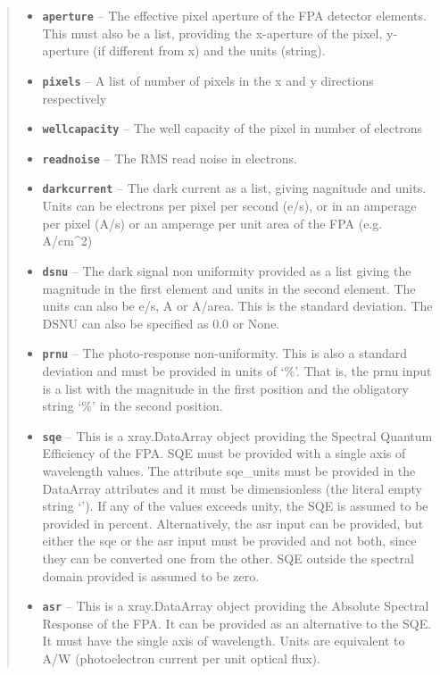 \documentclass[a4paper,10pt,english]{sphinxmanual}
\begin{document}
\begin{fulllineitems}
\begin{fulllineitems}
\begin{quote}
\begin{description}
\begin{itemize}
\item {} 
\textbf{\texttt{aperture}} -- The effective pixel aperture of the FPA detector elements. This must also be a list, providing
the x-aperture of the pixel, y-aperture (if different from x) and the units (string).

\item {} 
\textbf{\texttt{pixels}} -- A list of number of pixels in the x and y directions respectively

\item {} 
\textbf{\texttt{wellcapacity}} -- The well capacity of the pixel in number of electrons

\item {} 
\textbf{\texttt{readnoise}} -- The RMS read noise in electrons.

\item {} 
\textbf{\texttt{darkcurrent}} -- The dark current as a list, giving nagnitude and units. Units can be electrons per pixel
per second (e/s), or in an amperage per pixel (A/s) or an amperage per unit area of the FPA (e.g. A/cm\textasciicircum{}2)

\item {} 
\textbf{\texttt{dsnu}} -- The dark signal non uniformity provided as a list giving the magnitude in the first element
and units in the second element. The units can also be e/s, A or A/area. This is the standard deviation.
The DSNU can also be specified as 0.0 or None.

\item {} 
\textbf{\texttt{prnu}} -- The photo-response non-uniformity. This is also a standard deviation and must be provided in units
of `\%'. That is, the prnu input is a list with the magnitude in the first position and the obligatory
string `\%' in the second position.

\item {} 
\textbf{\texttt{sqe}} -- This is a xray.DataArray object providing the Spectral Quantum Efficiency of the FPA. SQE must be
provided with a single axis of wavelength values. The attribute sqe\_units must be provided in the
DataArray attributes and it must be dimensionless (the literal empty string `'). If any of the values
exceeds unity, the SQE is assumed to be provided in percent. Alternatively, the asr input can be provided,
but either the sqe or the asr input must be provided and not both, since they can be converted one from
the other. SQE outside the spectral domain provided is assumed to be zero.

\item {} 
\textbf{\texttt{asr}} -- This is a xray.DataArray object providing the Absolute Spectral Response of the FPA. It can be
provided as an alternative to the SQE. It must have the single axis of wavelength. Units are equivalent
to A/W (photoelectron current per unit optical flux).


\end{itemize}
\end{description}
\end{quote}
\end{fulllineitems}
\end{fulllineitems}
\end{document}
